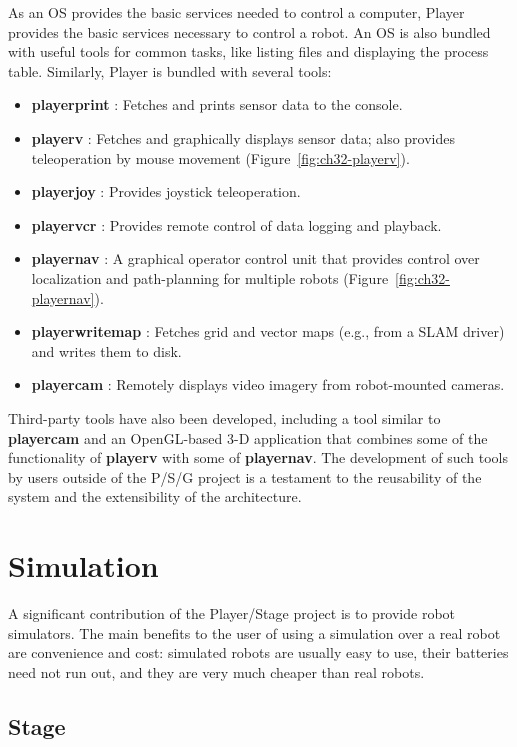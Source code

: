 As an OS provides the basic services needed to control a computer,
Player provides the basic services necessary to control a robot.
An OS is also bundled with useful tools for common tasks, like listing
files and displaying the process table.  Similarly, Player is bundled with
several tools:
\begin{itemize}
\item {\bf playerprint} : Fetches and prints sensor data to the console.
\item {\bf playerv} : Fetches and graphically displays sensor data; also
provides teleoperation by mouse movement (Figure~\ref{fig:ch32-playerv}).
\item {\bf playerjoy} : Provides joystick teleoperation.
\item {\bf playervcr} : Provides remote control of data logging and
playback.
\item {\bf playernav} : A graphical operator control unit that
provides control over localization and path-planning for multiple robots
(Figure~\ref{fig:ch32-playernav}).
\item {\bf playerwritemap} : Fetches grid and vector maps (e.g., from a
SLAM driver) and writes them to disk.
\item {\bf playercam} : Remotely displays video imagery from robot-mounted
cameras.
\end{itemize}
Third-party tools have also been developed, including a tool similar to
{\bf playercam} and an OpenGL-based 3-D application that combines some
of the functionality of {\bf playerv} with some of {\bf playernav}.
The development of such tools by users outside of the P/S/G project is
a testament to the reusability of the system and the extensibility of
the architecture.

\section{Simulation}

A significant contribution of the Player/Stage project is to provide
robot simulators. The main benefits to the user of using a simulation
over a real robot are convenience and cost: simulated robots are
usually easy to use, their batteries need not run out, and they are
very much cheaper than real robots.

\subsection{Stage}


